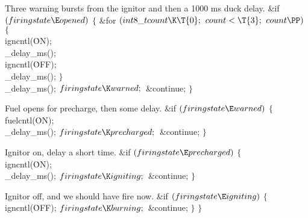 Three warning bursts from the ignitor and then a 1000 ms duck delay.
\Y\B\&{if} ${}(\\{firingstate}\E\\{opened}){}$\5
${}\{{}$\1\6
\&{for} ${}(\\{int8\_t}\\{count}\K\T{0};{}$ ${}\\{count}<\T{3};{}$ ${}\\{count}%
\PP){}$\5
${}\{{}$\1\6
\\{igncntl}(\.{ON});\6
\\{\_delay\_ms}();\6
\\{igncntl}(\.{OFF});\6
\\{\_delay\_ms}();\6
\4${}\}{}$\2\6
\\{\_delay\_ms}();\6
${}\\{firingstate}\K\\{warned};{}$\6
\&{continue};\6
\4${}\}{}$\2\par
\fi

Fuel opens for precharge, then some delay.
\Y\B\&{if} ${}(\\{firingstate}\E\\{warned}){}$\5
${}\{{}$\1\6
\\{fuelcntl}(\.{ON});\6
\\{\_delay\_ms}();\6
${}\\{firingstate}\K\\{precharged};{}$\6
\&{continue};\6
\4${}\}{}$\2\par
\fi

Ignitor on, delay a short time.
\Y\B\&{if} ${}(\\{firingstate}\E\\{precharged}){}$\5
${}\{{}$\1\6
\\{igncntl}(\.{ON});\6
\\{\_delay\_ms}();\6
${}\\{firingstate}\K\\{igniting};{}$\6
\&{continue};\6
\4${}\}{}$\2\par
\fi

Ignitor off, and we should have fire now.
\Y\B\&{if} ${}(\\{firingstate}\E\\{igniting}){}$\5
${}\{{}$\1\6
\\{igncntl}(\.{OFF});\6
${}\\{firingstate}\K\\{burning};{}$\6
\&{continue};\6
\4${}\}{}$\2\6
$\}{}$\par
\fi

